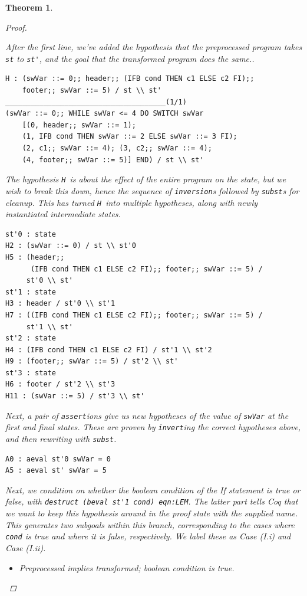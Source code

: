 \documentclass[12pt,notitlepage]{report}
\theoremstyle{plain}
\newtheorem{theo}{Theorem}[section]
\theoremstyle{definition}
\numberwithin{equation}{section}
\begin{document}
\begin{theo}
\begin{proof}
\begin{itemize}
        After the first line, we've added the hypothesis that the preprocessed program takes \verb$st$ to \verb$st'$, and the goal that the transformed program does the same..
        \begin{verbatim}
H : (swVar ::= 0;; header;; (IFB cond THEN c1 ELSE c2 FI);; 
    footer;; swVar ::= 5) / st \\ st'
______________________________________(1/1)
(swVar ::= 0;; WHILE swVar <= 4 DO SWITCH swVar
    [(0, header;; swVar ::= 1);
    (1, IFB cond THEN swVar ::= 2 ELSE swVar ::= 3 FI);
    (2, c1;; swVar ::= 4); (3, c2;; swVar ::= 4);
    (4, footer;; swVar ::= 5)] END) / st \\ st'\end{verbatim}
        \noindent The hypothesis \verb$H $is about the effect of the entire program on the state, but we wish to break this down, hence the sequence of \verb$inversion$s followed by \verb$subst$s for cleanup.   This has turned \verb$H $into multiple hypotheses, along with newly instantiated intermediate states.
        \begin{verbatim}
st'0 : state
H2 : (swVar ::= 0) / st \\ st'0
H5 : (header;;
      (IFB cond THEN c1 ELSE c2 FI);; footer;; swVar ::= 5) /
     st'0 \\ st'
st'1 : state
H3 : header / st'0 \\ st'1
H7 : ((IFB cond THEN c1 ELSE c2 FI);; footer;; swVar ::= 5) /
     st'1 \\ st'
st'2 : state
H4 : (IFB cond THEN c1 ELSE c2 FI) / st'1 \\ st'2
H9 : (footer;; swVar ::= 5) / st'2 \\ st'
st'3 : state
H6 : footer / st'2 \\ st'3
H11 : (swVar ::= 5) / st'3 \\ st'\end{verbatim}
\noindent Next, a pair of \verb$assert$ions give us new hypotheses of the value of \verb$swVar$ at the first and final states.  These are proven by \verb$invert$ing the correct hypotheses above, and then rewriting with \verb$subst$.
\begin{verbatim}
A0 : aeval st'0 swVar = 0
A5 : aeval st' swVar = 5
\end{verbatim}
\noindent Next, we condition on whether the boolean condition of the If statement is true or false, with \verb$destruct (beval st'1 cond) eqn:LEM$.  The latter part tells Coq that we want to keep this hypothesis around in the proof state with the supplied name.  This generates two subgoals within this branch, corresponding to the cases where \verb$cond$ is true and where it is false, respectively.  We label these as Case (I.i) and Case (I.ii).
            \begin{itemize}
                \item[(I.i)] Preprocessed implies transformed; boolean condition is true.
                

\end{itemize}
\end{itemize}
\end{proof}
\end{theo}
\end{document}
